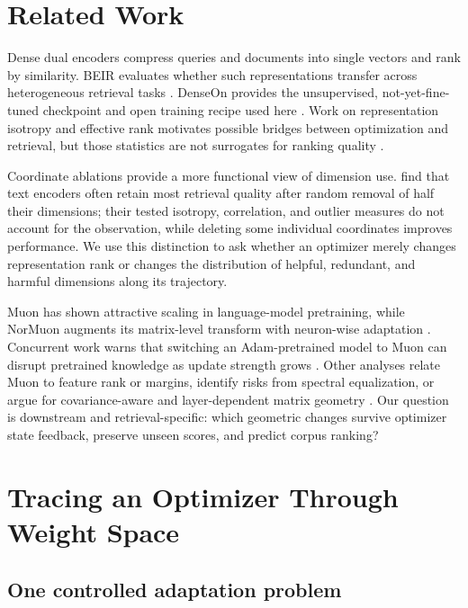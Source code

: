 \documentclass[11pt]{article}
\begin{document}
\section{Related Work}

Dense dual encoders compress queries and documents into single vectors and rank by similarity.
BEIR evaluates whether such representations transfer across heterogeneous retrieval tasks
\citep{thakur2021beir}. DenseOn provides the unsupervised, not-yet-fine-tuned checkpoint and open
training recipe used here \citep{sourty2026denseon}. Work on representation isotropy and effective
rank motivates possible bridges between optimization and retrieval, but those statistics are not
surrogates for ranking quality \citep{kim2024hil}.

Coordinate ablations provide a more functional view of dimension use. \citet{takeshita2025dimensions}
find that text encoders often retain most retrieval quality after random removal of half their
dimensions; their tested isotropy, correlation, and outlier measures do not account for the
observation, while deleting some individual coordinates improves performance. We use this distinction to ask whether an optimizer
merely changes representation rank or changes the distribution of helpful, redundant, and harmful
dimensions along its trajectory.

Muon has shown attractive scaling in language-model pretraining, while NorMuon augments its
matrix-level transform with neuron-wise adaptation \citep{liu2025muon,li2025normuon}. Concurrent
work warns that switching an Adam-pretrained model to Muon can disrupt pretrained knowledge as
update strength grows \citep{qu2026finetune,liu2026consistency}. Other analyses relate Muon to
feature rank or margins, identify risks from spectral equalization, or argue for covariance-aware
and layer-dependent matrix geometry \citep{ruan2026features,pang2026htmuon,du2026newtonmuon,
massena2026schatten}. Our question is downstream and retrieval-specific: which geometric changes
survive optimizer state feedback, preserve unseen scores, and predict corpus ranking?

\section{Tracing an Optimizer Through Weight Space}

\subsection{One controlled adaptation problem}
\end{document}
